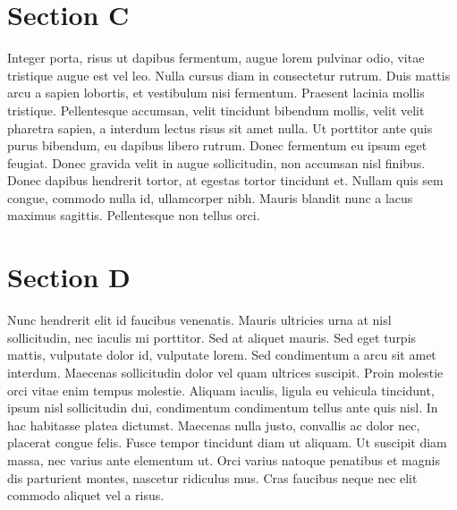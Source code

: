 \documentclass[a5paper]{article}
\begin{document}
\begin{sloppypar}
\section*{Section C}

Integer porta, risus ut dapibus fermentum, augue lorem pulvinar odio, vitae tristique augue est vel leo. Nulla cursus diam in consectetur rutrum. Duis mattis arcu a sapien lobortis, et vestibulum nisi fermentum. Praesent lacinia mollis tristique. Pellentesque accumsan, velit tincidunt bibendum mollis, velit velit pharetra sapien, a interdum lectus risus sit amet nulla. Ut porttitor ante quis purus bibendum, eu dapibus libero rutrum. Donec fermentum eu ipsum eget feugiat. Donec gravida velit in augue sollicitudin, non accumsan nisl finibus. Donec dapibus hendrerit tortor, at egestas tortor tincidunt et. Nullam quis sem congue, commodo nulla id, ullamcorper nibh. Mauris blandit nunc a lacus maximus sagittis. Pellentesque non tellus orci.

\section*{Section D}
Nunc hendrerit elit id faucibus venenatis. Mauris ultricies urna at nisl sollicitudin, nec iaculis mi porttitor. Sed at aliquet mauris. Sed eget turpis mattis, vulputate dolor id, vulputate lorem. Sed condimentum a arcu sit amet interdum. Maecenas sollicitudin dolor vel quam ultrices suscipit. Proin molestie orci vitae enim tempus molestie. Aliquam iaculis, ligula eu vehicula tincidunt, ipsum nisl sollicitudin dui, condimentum condimentum tellus ante quis nisl. In hac habitasse platea dictumst. Maecenas nulla justo, convallis ac dolor nec, placerat congue felis. Fusce tempor tincidunt diam ut aliquam. Ut suscipit diam massa, nec varius ante elementum ut. Orci varius natoque penatibus et magnis dis parturient montes, nascetur ridiculus mus. Cras faucibus neque nec elit commodo aliquet vel a risus.

\end{sloppypar}
\end{document}
